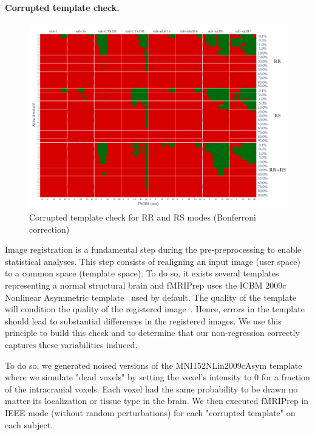 \documentclass{article}
\newcommand{\fmriprep}{fMRIPrep\xspace}
\begin{document}
\paragraph{Corrupted template check.}

\begin{figure}
    \centering
    \includegraphics[width=\linewidth]{figures/template/template_fwe_bonferroni.pdf}
    \caption{Corrupted template check for RR and RS modes (Bonferroni correction)}
    \label{fig:template_bonferroni}
\end{figure}

Image registration is a fundamental step during the pre-preprocessing to enable statistical analyses. This step consists of realigning an input image (user space) to a common space (template space). To do so, it exists several templates representing a normal structural brain and \fmriprep uses the ICBM 2009c Nonlinear Asymmetric template~\cite{fonov2011unbiased} used by default. The quality of the template will condition the quality of the registered image~\cite{li2021moving}. Hence, errors in the template should lead to substantial differences in the registered images. We use this principle to build this check and to determine that our non-regression correctly captures these variabilities induced.

To do so, we generated noised versions of the MNI152NLin2009cAsym template where we simulate "dead voxels" by setting the voxel's intensity to 0 for a fraction of the intracranial voxels. Each voxel had the same probability to be drawn no matter its localization or tissue type in the brain. We then executed \fmriprep in IEEE mode (without random perturbations) for each "corrupted template" on each subject.
\end{document}
